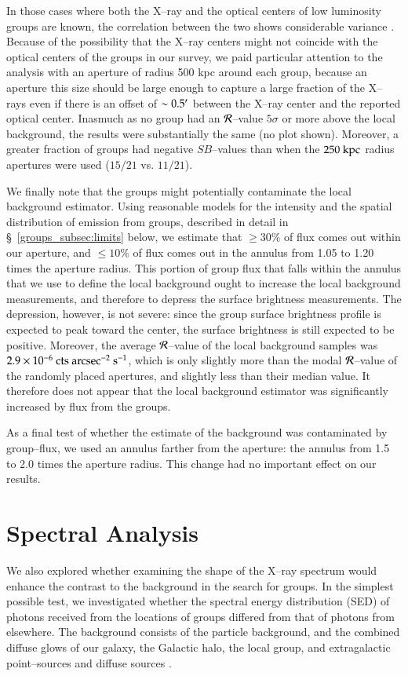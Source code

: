In those cases where both the X--ray and the optical centers of low
luminosity groups are known, the correlation between the two shows
considerable variance \citep{mulchaey2000}.  Because of the
possibility that the X--ray centers might not coincide with the
optical centers of the groups in our survey, we paid particular
attention to the analysis with an aperture of radius 500 kpc around
each group, because an aperture this size should be large enough to
capture a large fraction of the X--rays even if there is an offset of
$\sim 0.5\mbox{$^\prime$}$ between the X--ray center and the reported optical
center.  Inasmuch as no group had an $\mathcal{R}$--value $5\sigma$ or more
above the local background, the results were substantially the same
(no plot shown).  Moreover, a greater fraction of groups had negative
$SB$--values than when the $250 {\rm ~kpc}$ radius apertures were used
($15/21$ vs. $11/21$).

We finally note that the groups might potentially contaminate the
local background estimator.  Using reasonable models for the intensity
and the spatial distribution of emission from groups, described in
detail in \S~\ref{groups_subsec:limits} below, we estimate that $\ge 30\%$
of flux comes out within our aperture, and $\le 10\%$ of flux comes
out in the annulus from 1.05 to 1.20 times the aperture radius.  This
portion of group flux that falls within the annulus that we use to
define the local background ought to increase the local background
measurements, and therefore to depress the surface brightness
measurements.  The depression, however, is not severe: since the group
surface brightness profile is expected to peak toward the center, the
surface brightness is still expected to be positive.  Moreover, the
average $\mathcal{R}$--value of the local background samples was
$2.9\times10^{-6}{\rm~cts~arcsec^{-2}~s^{-1}}$, which is only slightly
more than the modal $\mathcal{R}$--value of the randomly placed apertures, and
slightly less than their median value.  It therefore does not appear
that the local background estimator was significantly increased by
flux from the groups.

As a final test of whether the estimate of the background was
contaminated by group--flux, we used an annulus farther from the
aperture: the annulus from 1.5 to 2.0 times the aperture radius.  This
change had no important effect on our results.


\section{Spectral Analysis}
\label{groups_sec:spec}
We also explored whether examining the shape of the X--ray spectrum
would enhance the contrast to the background in the search for groups.
In the simplest possible test, we investigated whether the spectral
energy distribution (SED) of photons received from the locations of
groups differed from that of photons from elsewhere.  The background
consists of the particle background, and the combined diffuse glows of
our galaxy, the Galactic halo, the local group, and extragalactic
point--sources and diffuse sources \citep{mccammon+sanders1990,
mccammon_et_al2002}.

